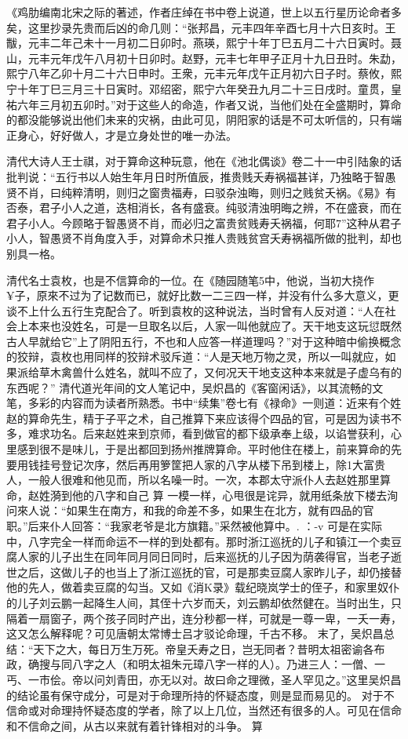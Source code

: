 {{《鸡肋编南北宋之际的著述，作者庄绰在书中卷上说道，世上以五行星历论命者多矣，这里抄录先贵而后凶的命几则：“张邦昌，元丰四年辛酉七月十六日亥时。王黻，元丰二年己未十一月初二日卯时。燕瑛，熙宁十年丁巳五月二十六日寅时。聂山，元丰元年戊午八月初十日卯时。赵野，元丰七年甲子正月十九日丑时。朱勐，熙宁八年乙卯十月二十六日申时。王衆，元丰元年戊午正月初六日子时。蔡攸，熙宁十年丁巳三月三十日寅时。邓绍密，熙宁六年癸丑九月二十三日戌时。童贯，皇祐六年三月初五卯时。”对于这些人的命造，作者又说，当他们处在全盛期时，算命的都没能够说出他们未来的灾祸，由此可见，阴阳家的话是不可太听信的，只有端正身心，好好做人，才是立身处世的唯一办法。

清代大诗人王士祺，对于算命这种玩意，他在《池北偶谈》卷二十一中引陆象的话批判说：“五行书以人始生年月日时所值辰，推贵贱夭寿祸福甚详，乃独略于智愚贤不肖，曰纯粹清明，则归之窗贵福寿，曰驳杂浊晦，则归之贱贫夭祸。《易》有否泰，君子小人之道，迭相消长，各有盛衰。纯驳清浊明晦之辨，不在盛衰，而在君子小人。今顾略于智愚贤不肖，而必归之富贵贫贱寿夭祸福，何耶7”这种从君子小人，智愚贤不肖角度入手，对算命术只推人贵贱贫宫夭寿祸福所做的批判，却也别具一格。

清代名士袁枚，也是不信算命的一位。在《随园随笔5中，他说，当初大挠作¥子，原來不过为了记数而已，就好比数一二三四一样，并没有什么多大意义，更谈不上什么五行生克配合了。听到袁枚的这种说法，当时曾有人反对道：“人在社会上本来也没姓名，可是一旦取名以后，人家一叫他就应了。天干地支这玩愆既然古人早就给它”上了阴阳五行，不也和人应答一样道理吗？”对于这种暗中偷换概念的狡辩，袁枚也用同样的狡辩术驳斥道：“人是天地万物之灵，所以一叫就应，如果派给草木禽兽什么姓名，就叫不应了，又何况天干地支这种本来就是子虚乌有的东西呢？”
清代道光年间的文人笔记中，吴炽昌的《客窗闲话》，以其流畅的文笔，多彩的内容而为读者所熟悉。书中“续集”卷七有《禄命》一则道：近来有个姓赵的算命先生，精于子平之术，自己推算下来应该得个四品的官，可是因为读书不多，难求功名。后来赵姓来到京师，看到做官的都下级承奉上级，以谄誉获利，心里感到很不是味儿，于是出都回到扬州推牌算命。平时他住在楼上，前来算命的先要用钱挂号登记次序，然后再用箩筐把人家的八字从楼下吊到楼上，除1大富贵人，一般人很难和他见而，所以名噪一时。一次，本郡太守派仆人去赵姓那里算命，赵姓漪到他的八字和自己
算
一模一样，心甩很是诧异，就用纸条放下楼去洵问來人说：“如果生在南方，和我的命差不多，如果生在北方，就有四品的官职。”后来仆人回答：“我家老爷是北方旗籍。”采然被他算中。.		：-v
可是在实际中，八字完全一样而命运不一样的到处都有。那时浙江巡抚的儿子和镇江一个卖豆腐人家的儿子出生在同年同月同日同时，后来巡抚的儿子因为荫袭得官，当老子逝世之后，这做儿子的也当上了浙江巡抚的官，可是那卖豆腐人家昨儿子，却仍接替他的先人，做着卖豆腐的勾当。又如《消K录》载纪晓岚学士的侄子，和家里奴仆的儿子刘云鹏一起降生人间，其侄十六岁而夭，刘云鹏却依然健在。当时出生，只隔着一扇窗子，两个孩子同时产出，连分秒都一样，可就是一尊一卑，一夭一寿，这又怎么解释呢？可见唐朝太常博士吕才驳论命理，千古不移。
末了，吴炽昌总结：“天下之大，每日万生万死。帝皇夭寿之日，岂无同者？昔明太祖密谕各布政，确搜与同八字之人（和明太祖朱元璋八字一样的人）。乃进三人：一僧、一丐、一市侩。帝以问刘青田，亦无以对。故曰命之理微，圣人罕见之。”这里吴炽昌的结论虽有保守成分，可是对于命理所持的怀疑态度，则是显而易见的。
对于不信命或对命理持怀疑态度的学者，除了以上几位，当然还有很多的人。可见在信命和不信命之间，从古以来就有着针锋相对的斗争。
算
}}

